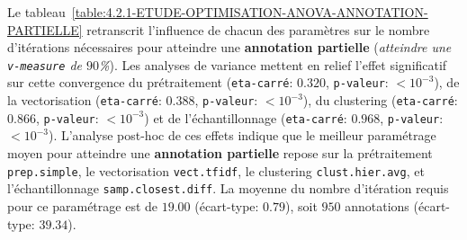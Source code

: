 			Le tableau~\ref{table:4.2.1-ETUDE-OPTIMISATION-ANOVA-ANNOTATION-PARTIELLE} retranscrit l'influence de chacun des paramètres sur le nombre d'itérations nécessaires pour atteindre une \textbf{annotation partielle} (\textit{atteindre une \texttt{v-measure} de $90$\%}).
			Les analyses de variance mettent en relief l'effet significatif sur cette convergence du prétraitement (\texttt{eta-carré}: $0.320$, \texttt{p-valeur}: $< 10^{-3}$), de la vectorisation (\texttt{eta-carré}: $0.388$, \texttt{p-valeur}: $< 10^{-3}$), du clustering (\texttt{eta-carré}: $0.866$, \texttt{p-valeur}: $< 10^{-3}$) et de l'échantillonnage (\texttt{eta-carré}: $0.968$, \texttt{p-valeur}: $< 10^{-3}$).
			L'analyse post-hoc de ces effets indique que le meilleur paramétrage moyen pour atteindre une \textbf{annotation partielle} repose sur la prétraitement \texttt{prep.simple}, le vectorisation \texttt{vect.tfidf}, le clustering \texttt{clust.hier.avg}, et l'échantillonnage \texttt{samp.closest.diff}. La moyenne du nombre d'itération requis pour ce paramétrage est de $19.00$ (écart-type: $0.79$), soit $950$ annotations (écart-type: $39.34$).
